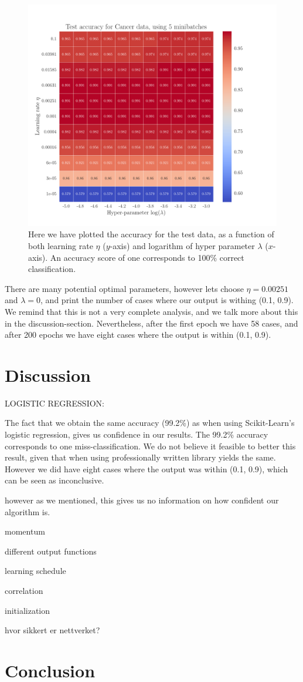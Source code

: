 \documentclass[12pt]{extarticle}
\begin{document}
\begin{figure}[h]
	\includegraphics[width=\linewidth]{../output/plots/reg_Cancer__lambda_eta__Test_accuracy__860729.pdf}
	\caption{Here we have plotted the accuracy for the test data, as a function of both learning rate $\eta$ ($y$-axis) and logarithm of hyper parameter $\lambda$ ($x$-axis). An accuracy score of one corresponds to 100\% correct classification.}\label{fig:logreg_eta_lambda}
\end{figure}

There are many potential optimal parameters, however lets choose $\eta= 0.00251$ and $\lambda = 0$, and print the number of cases where our output is withing (0.1, 0.9). We remind that this is not a very complete analysis, and we talk more about this in the discussion-section. Nevertheless, after the first epoch we have 58 cases, and after 200 epochs we have eight cases where the output is within (0.1, 0.9).  

\clearpage

\section{Discussion}

LOGISTIC REGRESSION:

The fact that we obtain the same accuracy (99.2\%) as when using Scikit-Learn's logistic regression, gives us confidence in our results. The 99.2\% accuracy corresponds to one miss-classification. We do not believe it feasible to better this result, given that when using professionally written library yields the same. However we did have eight cases where the output was within (0.1, 0.9), which can be seen as inconclusive.  


 however as we mentioned, this gives us no information on how confident our algorithm is. 

momentum

different output functions

learning schedule

correlation

initialization

hvor sikkert er nettverket?
\section{Conclusion}




\end{document}
